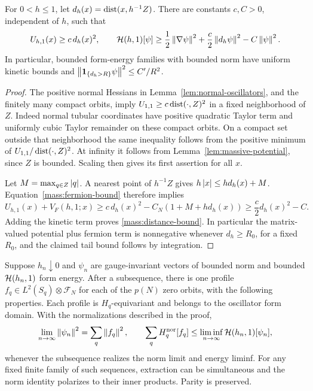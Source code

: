 \begin{lemma}
\label{mass:distance-confinement}
For \(0<h\leq1\), let
\(d_h(x)=\operatorname{dist}(x,h^{-1}Z)\). There are constants \(c,C>0\),
independent of \(h\), such that
\begin{equation}
\label{mass:distance-bound}
 U_{h,1}(x)\geq c\,d_h(x)^2,
 \qquad
 \mathcal H(h,1)[\psi]\geq
 \frac12\left\lVert \nabla\psi\right\rVert^2
 +\frac c2\left\lVert d_h\psi\right\rVert^2-C\left\lVert \psi\right\rVert^2.
\end{equation}
In particular, bounded form-energy families with bounded norm have
uniform kinetic bounds and
\(\left\lVert \mathbf1_{\{d_h>R\}}\psi\right\rVert^2\leq C'/R^2\).
\end{lemma}

\begin{proof}
The positive normal Hessians in
Lemma~\ref{lem:normal-oscillators}, and the finitely many compact
orbits, imply
\(U_{1,1}\geq c\operatorname{dist}(\cdot,Z)^2\) in a fixed neighborhood of
\(Z\). Indeed normal tubular coordinates have positive quadratic
Taylor term and uniformly cubic Taylor remainder on these compact
orbits. On a compact set outside that neighborhood the same
inequality follows from the positive minimum of
\(U_{1,1}/\operatorname{dist}(\cdot,Z)^2\). At infinity it follows from
Lemma~\ref{lem:massive-potential}, since \(Z\) is bounded. Scaling
then gives its first assertion for all \(x\).

Let \(M=\max_{q\in Z}\left\lvert q\right\rvert\). A nearest point of \(h^{-1}Z\)
gives \(h\left\lvert x\right\rvert\leq hd_h(x)+M\). Equation~\eqref{mass:fermion-bound}
therefore implies
\[
 U_{h,1}(x)+V_F(h,1;x)
 \geq c\,d_h(x)^2-C_N(1+M+hd_h(x))
 \geq \frac c2d_h(x)^2-C.
\]
Adding the kinetic term proves \eqref{mass:distance-bound}.
In particular the matrix-valued potential plus fermion term is
nonnegative whenever \(d_h\geq R_0\), for a fixed \(R_0\), and
the claimed tail bound follows by integration.
\end{proof}

\begin{lemma}
\label{mass:slice-compactness}
Suppose \(h_n\downarrow0\) and \(\psi_n\) are gauge-invariant
vectors of bounded norm and bounded \(\mathcal H(h_n,1)\) form energy.
After a subsequence, there is one profile
\(f_q\in L^2(S_q)\otimes\mathcal F_N\) for each of the \(p(N)\) zero
orbits, with the following properties. Each profile is
\(H_q\)-equivariant and belongs to the oscillator form domain.
With the normalizations described in the proof,
\begin{equation}
\label{mass:slice-exhaustion}
 \lim_{n\to\infty}\left\lVert \psi_n\right\rVert^2
   =\sum_q\left\lVert f_q\right\rVert^2,
 \qquad
 \sum_q H_q^{\mathrm{nor}}[f_q]
   \leq\liminf_{n\to\infty}\mathcal H(h_n,1)[\psi_n],
\end{equation}
whenever the subsequence realizes the norm limit and energy
liminf. For any fixed finite family of such sequences, extraction
can be simultaneous and the norm identity polarizes to their inner
products. Parity is preserved.
\end{lemma}


